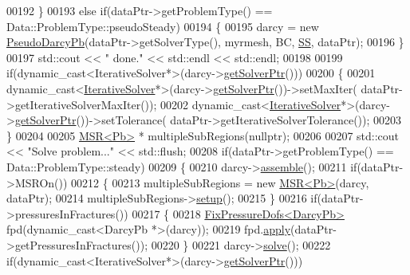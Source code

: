 \begin{DoxyCode}
00192     \}
00193     \textcolor{keywordflow}{else} \textcolor{keywordflow}{if}(dataPtr->getProblemType() == Data::ProblemType::pseudoSteady)
00194     \{
00195         darcy = \textcolor{keyword}{new} \hyperlink{main_8cpp_aff54e4c6bbc30b11899898af00325b15}{PseudoDarcyPb}(dataPtr->getSolverType(), myrmesh, BC, 
      \hyperlink{namespaceFVCode3D_ae8b0f97f0774db9f0881cfc5f31d93f4}{SS}, dataPtr);
00196     \}
00197     std::cout << \textcolor{stringliteral}{" done."} << std::endl << std::endl;
00198 
00199     \textcolor{keywordflow}{if}(dynamic\_cast<IterativeSolver*>(darcy->\hyperlink{classFVCode3D_1_1Problem_a24f0f7e726e4c68a0eac87a4a4054823}{getSolverPtr}()))
00200     \{
00201         \textcolor{keyword}{dynamic\_cast<}\hyperlink{classFVCode3D_1_1IterativeSolver}{IterativeSolver}*\textcolor{keyword}{>}(darcy->\hyperlink{classFVCode3D_1_1Problem_a24f0f7e726e4c68a0eac87a4a4054823}{getSolverPtr}())->setMaxIter(
      dataPtr->getIterativeSolverMaxIter());
00202         \textcolor{keyword}{dynamic\_cast<}\hyperlink{classFVCode3D_1_1IterativeSolver}{IterativeSolver}*\textcolor{keyword}{>}(darcy->\hyperlink{classFVCode3D_1_1Problem_a24f0f7e726e4c68a0eac87a4a4054823}{getSolverPtr}())->setTolerance(
      dataPtr->getIterativeSolverTolerance());
00203     \}
00204 
00205     \hyperlink{classFVCode3D_1_1MSR}{MSR<Pb>} * multipleSubRegions(\textcolor{keyword}{nullptr});
00206 
00207     std::cout << \textcolor{stringliteral}{"Solve problem..."} << std::flush;
00208     \textcolor{keywordflow}{if}(dataPtr->getProblemType() == Data::ProblemType::steady)
00209     \{
00210         darcy->\hyperlink{classFVCode3D_1_1Problem_aa3f0a44084a56374f5ac7f242e0e45f7}{assemble}();
00211         \textcolor{keywordflow}{if}(dataPtr->MSROn())
00212         \{
00213             multipleSubRegions = \textcolor{keyword}{new} \hyperlink{classFVCode3D_1_1MSR}{MSR<Pb>}(darcy, dataPtr);
00214             multipleSubRegions->\hyperlink{classFVCode3D_1_1MSR_aea841370ef1133a635c885714670abec}{setup}();
00215         \}
00216         \textcolor{keywordflow}{if}(dataPtr->pressuresInFractures())
00217         \{
00218             \hyperlink{classFVCode3D_1_1FixPressureDofs}{FixPressureDofs<DarcyPb>} fpd(dynamic\_cast<DarcyPb *>(darcy));
00219             fpd.\hyperlink{classFVCode3D_1_1FixPressureDofs_a3393776b99ad339672ba99cfc5c200e2}{apply}(dataPtr->getPressuresInFractures());
00220         \}
00221         darcy->\hyperlink{classFVCode3D_1_1Problem_a7ee30db5a251dc7a9778c821e49cf376}{solve}();
00222         \textcolor{keywordflow}{if}(dynamic\_cast<IterativeSolver*>(darcy->\hyperlink{classFVCode3D_1_1Problem_a24f0f7e726e4c68a0eac87a4a4054823}{getSolverPtr}()))

\end{DoxyCode}
